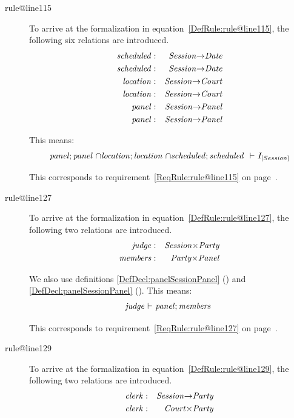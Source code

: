 \documentclass[10pt,a4paper]{report}              %
\theoremstyle{plain}\theorembodyfont{\rmfamily}\newtheorem{definition}{Definition}[section]
\theoremstyle{plain}\theorembodyfont{\rmfamily}\newtheorem{designrule}[definition]{Requirement}
\def\id#1{\mbox{\em #1\/}}
\begin{document}
\begin{description}
\item[rule@line115]
To arrive at the formalization in equation~\ref{DefRule:rule@line115}, the following six relations are introduced.
\begin{eqnarray}
   {\id{scheduled}}&:&{\id{Session}}{\rightarrow}{\id{Date}}\label{DefDecl:scheduledSessionDate}\\
   {\id{scheduled}}&:&{\id{Session}}{\rightarrow}{\id{Date}}\label{DefDecl:scheduledSessionDate}\\
   {\id{location}}&:&{\id{Session}}{\rightarrow}{\id{Court}}\label{DefDecl:locationSessionCourt}\\
   {\id{location}}&:&{\id{Session}}{\rightarrow}{\id{Court}}\label{DefDecl:locationSessionCourt}\\
   {\id{panel}}&:&{\id{Session}}{\rightarrow}{\id{Panel}}\label{DefDecl:panelSessionPanel}\\
   {\id{panel}}&:&{\id{Session}}{\rightarrow}{\id{Panel}}\label{DefDecl:panelSessionPanel}
\end{eqnarray}

This means: 
\begin{equation}
   {\id{panel}};{\id{panel}}~{\cap}{\id{location}};{\id{location}}~{\cap}{\id{scheduled}};{\id{scheduled}}~\ {\vdash}\ I_{[Session]}\label{DefRule:rule@line115}
\end{equation}

This corresponds to requirement~\ref{ReqRule:rule@line115} on page~\pageref{ReqRule:rule@line115}.
\item[rule@line127]
To arrive at the formalization in equation~\ref{DefRule:rule@line127}, the following two relations are introduced.
\begin{eqnarray}
   {\id{judge}}&:&{\id{Session}}{\times}{\id{Party}}\label{DefDecl:judgeSessionParty}\\
   {\id{members}}&:&{\id{Party}}{\times}{\id{Panel}}\label{DefDecl:membersPartyPanel}
\end{eqnarray}

We also use definitions \ref{DefDecl:panelSessionPanel} ({}) and \ref{DefDecl:panelSessionPanel} ({}). 
This means: 
\begin{equation}
   {\id{judge}}\ {\vdash}\ {\id{panel}};{\id{members}}~\label{DefRule:rule@line127}
\end{equation}

This corresponds to requirement~\ref{ReqRule:rule@line127} on page~\pageref{ReqRule:rule@line127}.
\item[rule@line129]
To arrive at the formalization in equation~\ref{DefRule:rule@line129}, the following two relations are introduced.
\begin{eqnarray}
   {\id{clerk}}&:&{\id{Session}}{\rightarrow}{\id{Party}}\label{DefDecl:clerkSessionParty}\\
   {\id{clerk}}&:&{\id{Court}}{\times}{\id{Party}}\label{DefDecl:clerkCourtParty}
\end{eqnarray}


\end{description}
\end{document}
